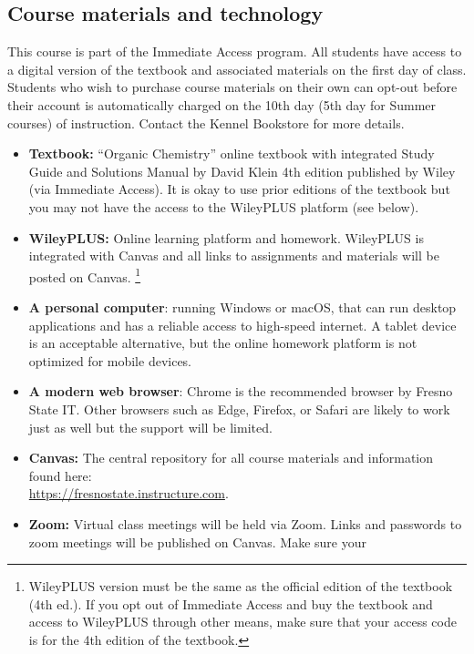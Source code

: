 \hypertarget{course-materials-and-technology}{%
\subsection{Course materials and
technology}\label{course-materials-and-technology}}

This course is part of the Immediate Access program. All students have
access to a digital version of the textbook and associated materials on
the first day of class. Students who wish to purchase course materials
on their own can opt-out before their account is automatically charged
on the 10th day (5th day for Summer courses) of instruction. Contact the
Kennel Bookstore for more details.

\begin{itemize}
\tightlist
\item
  \textbf{Textbook:} ``Organic Chemistry'' online textbook with
  integrated Study Guide and Solutions Manual by David Klein 4th edition
  published by Wiley (via Immediate Access). It is okay to use prior
  editions of the textbook but you may not have the access to the
  WileyPLUS platform (see below).
\item
  \textbf{WileyPLUS:} Online learning platform and homework. WileyPLUS
  is integrated with Canvas and all links to assignments and materials
  will be posted on Canvas. \footnote{WileyPLUS version must be the same
    as the official edition of the textbook (4th ed.). If you opt out of
    Immediate Access and buy the textbook and access to WileyPLUS
    through other means, make sure that your access code is for the 4th
    edition of the textbook.}
\item
  \textbf{A personal computer}: running Windows or macOS, that can run
  desktop applications and has a reliable access to high-speed internet.
  A tablet device is an acceptable alternative, but the online homework
  platform is not optimized for mobile devices.
\item
  \textbf{A modern web browser}: Chrome is the recommended browser by
  Fresno State IT. Other browsers such as Edge, Firefox, or Safari are
  likely to work just as well but the support will be limited.
\item
  \textbf{Canvas:} The central repository for all course materials and
  information found here:\\
  \url{https://fresnostate.instructure.com}.
\item
  \textbf{Zoom:} Virtual class meetings will be held via Zoom. Links and
  passwords to zoom meetings will be published on Canvas. Make sure your

\end{itemize}
